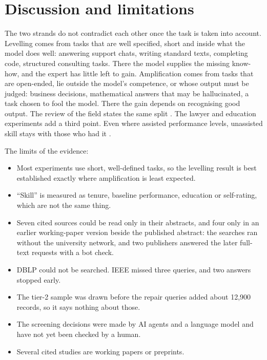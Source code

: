 \section{Discussion and limitations}
\label{who-gains:discussion}

The two strands do not contradict each other once the task is taken into
account. Levelling comes from tasks that are well specified, short and
inside what the model does well: answering support chats, writing
standard texts, completing code, structured consulting tasks. There the
model supplies the missing know-how, and the expert has little left to
gain. Amplification comes from tasks that are open-ended, lie outside
the model's competence, or whose output must be judged: business
decisions, mathematical answers that may be hallucinated, a task chosen
to fool the model. There the gain depends on recognising good output.
The review of the field states the same split \autocite{DelRioChanona2025AI}.
The lawyer and education experiments add a third point. Even where
assisted performance levels, unassisted skill stays with those who had
it \autocite{Autor2026Does,Cruces2026Does}.

The limits of the evidence:
\begin{itemize}
\item Most experiments use short, well-defined tasks, so the levelling
  result is best established exactly where amplification is least
  expected.
\item \enquote{Skill} is measured as tenure, baseline performance,
  education or self-rating, which are not the same thing.
\item Seven cited sources could be read only in their abstracts, and
  four only in an earlier working-paper version beside the published
  abstract: the searches ran without the university network, and two
  publishers answered the later full-text requests with a bot check.
\item DBLP could not be searched. IEEE missed three queries, and two
  answers stopped early.
\item The tier-2 sample was drawn before the repair queries added about
  12,900 records, so it says nothing about those.
\item The screening decisions were made by AI agents and a language
  model and have not yet been checked by a human.
\item Several cited studies are working papers or preprints.
\end{itemize}

